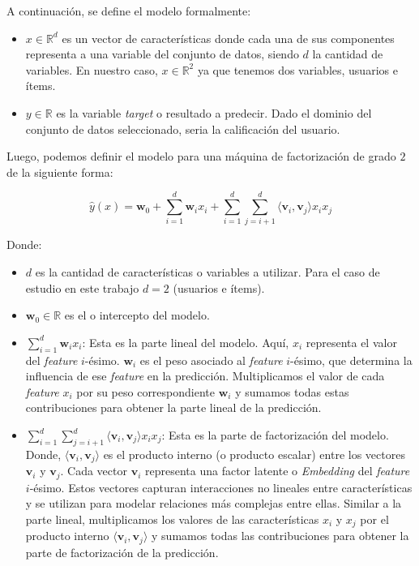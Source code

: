 \documentclass[11pt,a4paper,twoside]{thesis}
\begin{document}
A continuación, se define el modelo formalmente:

\begin{itemize}
	\item $x\in\mathbb{R}^{d}$ es un vector de características donde cada una de sus
	      componentes representa a una variable del conjunto de datos, siendo $d$
	      la cantidad de variables. En nuestro caso,
	      $x\in\mathbb{R}^{2}$ ya que tenemos dos variables, usuarios e ítems.
	\item $y\in\mathbb{R}$ es la variable \textit{target} o resultado a predecir.
	      Dado el dominio del conjunto de datos seleccionado, seria la
	      calificación del usuario.
\end{itemize}

Luego, podemos definir el modelo para una máquina de factorización de grado $2$
de la siguiente forma:

\begin{equation}
	\hat{y}(x) = \mathbf{w}_0 + \sum_{i=1}^d \mathbf{w}_i x_i + \sum_{i=1}^d\sum_{j=i+1}^d
	\langle\mathbf{v}_i, \mathbf{v}_j\rangle x_i x_j
\end{equation}
\begin{description}
	\item[Donde:]
\end{description}
\begin{itemize}
	\item $d$ es la cantidad de características o variables a utilizar.
	      Para el caso de estudio en este trabajo $d=2$ (usuarios e ítems).
	\item $\mathbf{w}_0 \in \mathbb{R}$ es el  o intercepto del modelo.
	\item $\sum_{i=1}^d \mathbf{w}_i x_i$: Esta es la parte lineal del modelo. Aquí,
	      $x_i$ representa el valor del \textit{feature} $i$-ésimo. $\mathbf{w}_i$ es
	      el peso asociado al \textit{feature} $i$-ésimo, que determina la influencia
	      de ese \textit{feature} en la predicción. Multiplicamos el valor de cada
	      \textit{feature} $x_i$ por su peso correspondiente $\mathbf{w}_i$ y sumamos
	      todas estas contribuciones para obtener la parte lineal de la predicción.
	\item $\sum_{i=1}^d\sum_{j=i+1}^d \langle\mathbf{v}_i, \mathbf{v}_j\rangle x_i x_j$:
	      Esta es la parte de factorización del modelo. Donde, $\langle\mathbf{v}_i,
		      \mathbf{v}_j\rangle$ es el producto interno (o producto escalar) entre
	      los vectores $\mathbf{v}_i$ y $\mathbf{v}_j$. Cada vector $\mathbf{v}_i$
	      representa una factor latente o \textit{Embedding} del \textit{feature}
	      $i$-ésimo. Estos vectores capturan interacciones no lineales entre
	      características y se utilizan para modelar relaciones más complejas
	      entre ellas. Similar a la parte lineal, multiplicamos los valores
	      de las características $x_i$ y $x_j$ por el producto interno
	      $\langle\mathbf{v}_i, \mathbf{v}_j\rangle$ y sumamos todas las contribuciones
	      para obtener la parte de factorización de la predicción.

\end{itemize}
\end{document}
